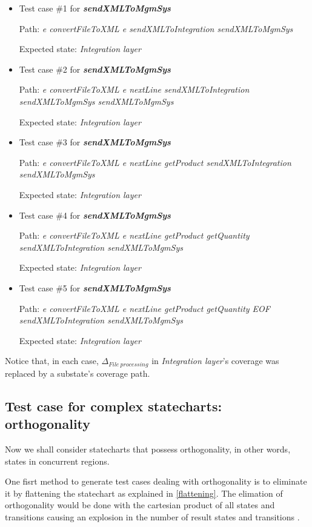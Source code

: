 \begin{itemize}

\item Test case \#1 for \textit{\textbf{sendXMLToMgmSys}}

Path: \textit{e convertFileToXML e sendXMLToIntegration sendXMLToMgmSys}

Expected state: \textit{Integration layer}

\item Test case \#2 for \textit{\textbf{sendXMLToMgmSys}}

Path: \textit{e convertFileToXML e  nextLine sendXMLToIntegration sendXMLToMgmSys sendXMLToMgmSys}

Expected state: \textit{Integration layer}


\item Test case \#3 for \textit{\textbf{sendXMLToMgmSys}}

Path: \textit{e convertFileToXML e  nextLine  getProduct sendXMLToIntegration sendXMLToMgmSys}

Expected state: \textit{Integration layer}

\item Test case \#4 for \textit{\textbf{sendXMLToMgmSys}}

Path: \textit{e convertFileToXML e  nextLine  getProduct  getQuantity sendXMLToIntegration sendXMLToMgmSys}

Expected state: \textit{Integration layer}

\item Test case \#5 for \textit{\textbf{sendXMLToMgmSys}}

Path: \textit{e convertFileToXML e  nextLine  getProduct  getQuantity EOF sendXMLToIntegration sendXMLToMgmSys}

Expected state: \textit{Integration layer}

\end{itemize}

Notice that, in each case, $\Delta_{File\ processing}$ in \textit{Integration layer}'s coverage was replaced by a substate's coverage path.

\subsection{Test case for complex statecharts: orthogonality}

Now we shall consider statecharts that possess orthogonality, in other words, states in concurrent regions.

One fisrt method to generate test cases dealing with orthogonality is to eliminate it by flattening the statechart as explained in \ref{flattening}. The elimation of orthogonality would be done with the cartesian product of all states and transitions causing an explosion in the number of result states and transitions \cite{bogdanov}.

